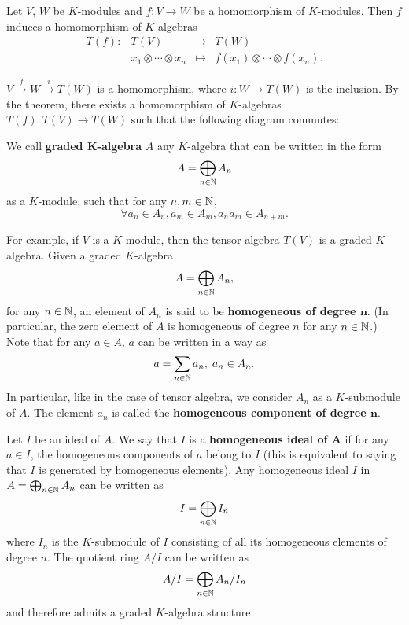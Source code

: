 \begin{corollaryenv}
    Let $V$, $W$ be $K$-modules and $f : V\rightarrow W$ be a homomorphism of $K$-modules.
    Then $f$ induces a homomorphism of $K$-algebras 
    $$ \begin{array}{rrcl}
        T(f) : & T(V) & \longrightarrow & T(W)\\
        & x_1 \otimes \cdots \otimes x_n & \longmapsto & f(x_1) \otimes \cdots \otimes f(x_n).
    \end{array}$$
\end{corollaryenv}
\begin{proofenv}
    $V \overset{f}{\longrightarrow} W \overset{i}{\longrightarrow} T(W) $ is a homomorphism, where $i: W \longrightarrow T(W)$ is the inclusion.
    By the theorem, there exists a homomorphism of $K$-algebras $T(f) : T(V) \rightarrow T(W)$ such that the following diagram commutes:
    \begin{center}    
    \end{center}
\end{proofenv}

\begin{remark}
    We call \textbf{graded $\bm{K}$-algebra} $A$ any $K$-algebra that can be written in the form
    $$ A = \bigoplus_{n\in \mathbb{N}} A_n$$
    as a $K$-module, such that for any $n,m \in \mathbb{N}$,
    $$ \forall a_n \in A_n, a_m \in A_m, a_n a_m \in A_{n+m}.$$
    
    \quad For example, if $V$ is a $K$-module, then the tensor algebra $T(V)$ is a graded $K$-algebra.
    Given a graded $K$-algebra
    $$ A = \bigoplus_{n\in \mathbb{N}} A_n,$$
    for any $n \in \mathbb{N}$, an element of $A_n$ is said to be \textbf{homogeneous of degree $\bm{n}$}.
    (In particular, the zero element of $A$ is homogeneous of degree $n$ for any $n\in \mathbb{N}$.)
    Note that for any $a \in A$, $a$ can be written in a  way as
    $$ a = \sum_{n\in \mathbb{N}} a_n,\; a_n \in A_n.$$
    In particular, like in the case of tensor algebra, we consider $A_n$ as a $K$-submodule of $A$.
    The element $a_n$ is called the \textbf{homogeneous component of degree $\bm{n}$}.
    
    \quad Let $I$ be an ideal of $A$.
    We say that $I$ is a \textbf{homogeneous ideal of $\bm{A}$} if for any $a \in I$, the homogeneous components of $a$ belong to $I$ (this is equivalent to saying that $I$ is generated by homogeneous elements).
    Any homogeneous ideal $I$ in $A = \bigoplus_{n \in \mathbb{N}} A_n$ can be written as
    $$ I = \bigoplus_{n\in \mathbb{N}} I_n$$
    where $I_n$ is the $K$-submodule of $I$ consisting of all its homogeneous elements of degree $n$.
    The quotient ring $A/I$ can be written as
    $$ A/I = \bigoplus_{n\in \mathbb{N}} A_n/I_n$$
    and therefore admits a graded $K$-algebra structure.
\end{remark}


